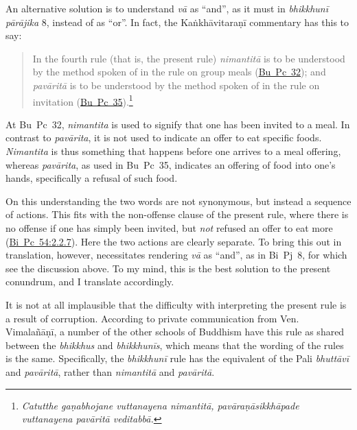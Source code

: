 \documentclass[12pt,openany]{book}%
\begin{document}
An alternative solution is to understand \textit{\textsanskrit{vā}} as “and”, as it must in \textit{\textsanskrit{bhikkhunī} \textsanskrit{pārājika}} 8, instead of as “or”. In fact, the \textsanskrit{Kaṅkhāvitaraṇī} commentary has this to say:

\begin{quotation}%
In the fourth rule (that is, the present rule) \textit{\textsanskrit{nimantitā}} is to be understood by the method spoken of in the rule on group meals (\href{https://suttacentral.net/pli-tv-bu-vb-pc32/en/brahmali\#8.15.1}{Bu~Pc~32}); and \textit{\textsanskrit{pavāritā}} is to be understood by the method spoken of in the rule on invitation (\href{https://suttacentral.net/pli-tv-bu-vb-pc35/en/brahmali\#2.15.1}{Bu~Pc~35}).\footnote{\textit{Catutthe \textsanskrit{gaṇabhojane} vuttanayena \textsanskrit{nimantitā}, \textsanskrit{pavāraṇāsikkhāpade} vuttanayena \textsanskrit{pavāritā} \textsanskrit{veditabbā}.} }

%
\end{quotation}

At Bu Pc 32, \textit{nimantita} is used to signify that one has been invited to a meal. In contrast to \textit{\textsanskrit{pavārita}}, it is not used to indicate an offer to eat specific foods. \textit{Nimantita} is thus something that happens before one arrives to a meal offering, whereas \textit{\textsanskrit{pavārita}}, as used in Bu Pc 35, indicates an offering of food into one’s hands, specifically a refusal of such food.

On this understanding the two words are not synonymous, but instead a sequence of actions. This fits with the non-offense clause of the present rule, where there is no offense if one has simply been invited, but \emph{not} refused an offer to eat more (\href{https://suttacentral.net/pli-tv-bi-vb-pc54/en/brahmali\#2.2.7}{Bi~Pc~54:2.2.7}). Here the two actions are clearly separate. To bring this out in translation, however, necessitates rendering \textit{\textsanskrit{vā}} as “and”, as in Bi Pj 8, for which see the discussion above. To my mind, this is the best solution to the present conundrum, and I translate accordingly.

It is not at all implausible that the difficulty with interpreting the present rule is a result of corruption. According to private communication from Ven. \textsanskrit{Vimalañāṇī}, a number of the other schools of Buddhism have this rule as shared between the \textit{bhikkhus} and \textit{\textsanskrit{bhikkhunīs}}, which means that the wording of the rules is the same. Specifically, the \textit{\textsanskrit{bhikkhunī}} rule has the equivalent of the Pali \textit{\textsanskrit{bhuttāvī}} and \textit{\textsanskrit{pavāritā}}, rather than \textit{\textsanskrit{nimantitā}} and \textit{\textsanskrit{pavāritā}}.
\end{document}

